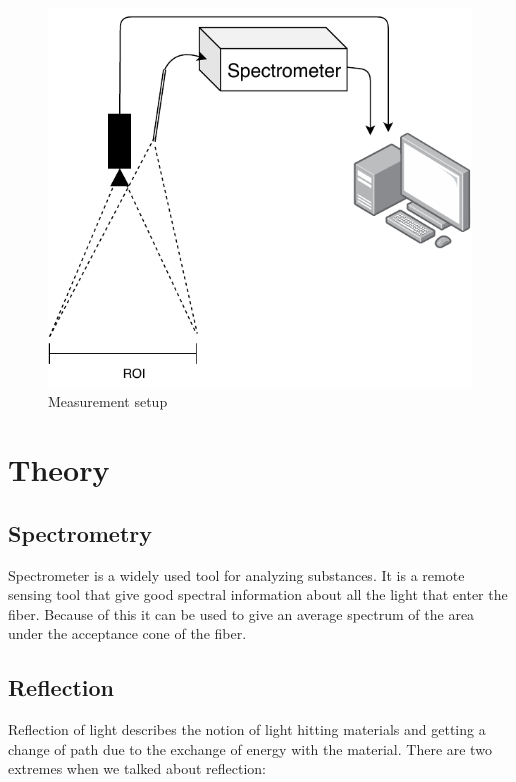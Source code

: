 \documentclass{article}
\begin{document}
\begin{figure}[hb]
    \centering
    \includegraphics[width=1\textwidth]{figures/pt_setup.pdf}
    \caption{Measurement setup}
    \label{fig:measurement_setup}
\end{figure}


\section{Theory}

\subsection{Spectrometry }
Spectrometer is a widely used tool for analyzing substances. It is a remote sensing tool that give good spectral information about all the light that enter the fiber. Because of this it can be used to give an average spectrum of the area under the acceptance cone of the fiber. 

\subsection{Reflection}
Reflection of light describes the notion of light hitting materials and getting a change of path due to the exchange of energy with the material. There are two extremes when we talked about reflection:
\end{document}
